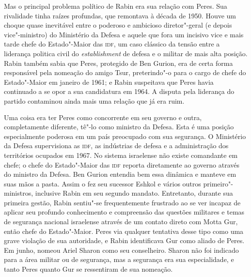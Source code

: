 Mas o principal problema político de Rabin era sua relação com Peres.
Sua rivalidade tinha raízes profundas, que remontava à década de 1950.
Houve um choque quase inevitável entre o poderoso e ambicioso diretor"-geral
(e depois vice"-ministro) do Ministério da Defesa e aquele que fora um incisivo
vice e mais tarde chefe do Estado"-Maior das \textsc{idf}, um caso clássico da
tensão entre a liderança politica civil do \emph{establishment} de
defesa e o militar de mais alta posição. Rabin também sabia que Peres,
protegido de Ben Gurion, era de certa forma responsável pela nomeação do
amigo Tsur, preterindo"-o para o cargo de chefe do Estado"-Maior em
janeiro de 1961; e Rabin suspeitava que Peres havia continuado a se opor
a sua candidatura em 1964. A disputa pela liderança do partido
contaminou ainda mais uma relação que já era ruim.

Uma coisa era ter Peres como concorrente em seu governo e outra,
completamente diferente, tê"-lo como ministro da Defesa. Esta é uma
posição especialmente poderosa em um país preocupado com sua segurança.
O Ministério da Defesa supervisiona as \textsc{idf}, as indústrias de defesa e a
administração dos territórios ocupados em 1967. No sistema israelense
não existe comandante em chefe; o chefe do Estado"-Maior das \textsc{idf} reporta
diretamente ao governo através do ministro da Defesa. Ben Gurion
entendia bem essa dinâmica e manteve em suas mãos a pasta.
Assim o fez seu sucessor Eshkol e vários outros primeiro"-ministros,
inclusive Rabin em seu segundo mandato. Entretanto, durante sua primeira gestão,
Rabin sentiu"-se frequentemente frustrado ao se ver incapaz de aplicar
seu profundo conhecimento e compreensão das questões militares e temas
de segurança nacional israelense através de um contato direto com Motta
Gur, então chefe do Estado"-Maior. Peres via qualquer tentativa desse
tipo como uma grave violação de sua autoridade, e Rabin identificava Gur
como aliado de Peres. Em junho, nomeou Ariel Sharon como seu
conselheiro. Sharon não foi indicado para a área militar ou de segurança,
mas a segurança era sua especialidade, e tanto Peres quanto Gur se
ressentiram de sua nomeação.

